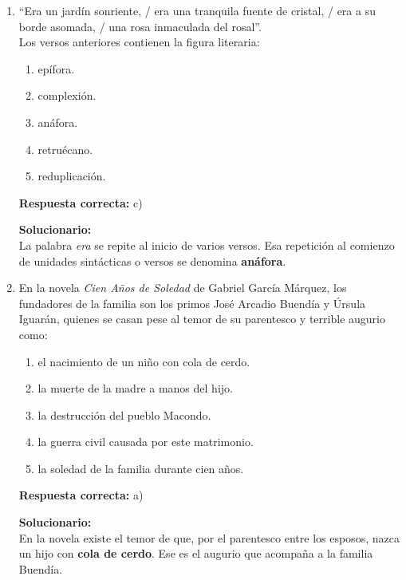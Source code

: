 \begin{enumerate}
	
	\item ``Era un jardín sonriente, / era una tranquila fuente de cristal, / era a su borde asomada, / una rosa inmaculada del rosal''.\\
	Los versos anteriores contienen la figura literaria:
	\begin{enumerate}[label=\alph*)]
		\item epífora.
		\item complexión.
		\item anáfora.
		\item retruécano.
		\item reduplicación.
	\end{enumerate}
	\textbf{Respuesta correcta:} c)
	
	\vspace{2mm}
	\textbf{Solucionario:}\\
	La palabra \textit{era} se repite al inicio de varios versos. Esa repetición al comienzo de unidades sintácticas o versos se denomina \textbf{anáfora}.
	
	\vspace{6mm}
	
	\item En la novela \textit{Cien Años de Soledad} de Gabriel García Márquez, los fundadores de la familia son los primos José Arcadio Buendía y Úrsula Iguarán, quienes se casan pese al temor de su parentesco y terrible augurio como:
	\begin{enumerate}[label=\alph*)]
		\item el nacimiento de un niño con cola de cerdo.
		\item la muerte de la madre a manos del hijo.
		\item la destrucción del pueblo Macondo.
		\item la guerra civil causada por este matrimonio.
		\item la soledad de la familia durante cien años.
	\end{enumerate}
	\textbf{Respuesta correcta:} a)
	
	\vspace{2mm}
	\textbf{Solucionario:}\\
	En la novela existe el temor de que, por el parentesco entre los esposos, nazca un hijo con \textbf{cola de cerdo}. Ese es el augurio que acompaña a la familia Buendía.
	
	\vspace{6mm}
	

\end{enumerate}
